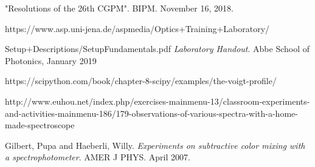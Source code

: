\documentclass{article}
\begin{document}
 "Resolutions of the 26th CGPM". BIPM. November 16, 2018. 
 
  https://www.asp.uni-jena.de/aspmedia/Optics+Training+Laboratory/
  
  Setup+Descriptions/SetupFundamentals.pdf
  \emph{Laboratory Handout}.
  Abbe School of Photonics,
  January 2019
  
https://scipython.com/book/chapter-8-scipy/examples/the-voigt-profile/

http://www.euhou.net/index.php/exercises-mainmenu-13/classroom-experiments-and-activities-mainmenu-186/179-observations-of-various-spectra-with-a-home-made-spectroscope

Gilbert, Pupa and Haeberli, Willy. \emph{Experiments on subtractive color mixing with a spectrophotometer}. AMER J PHYS. April 2007.
\end{document}
